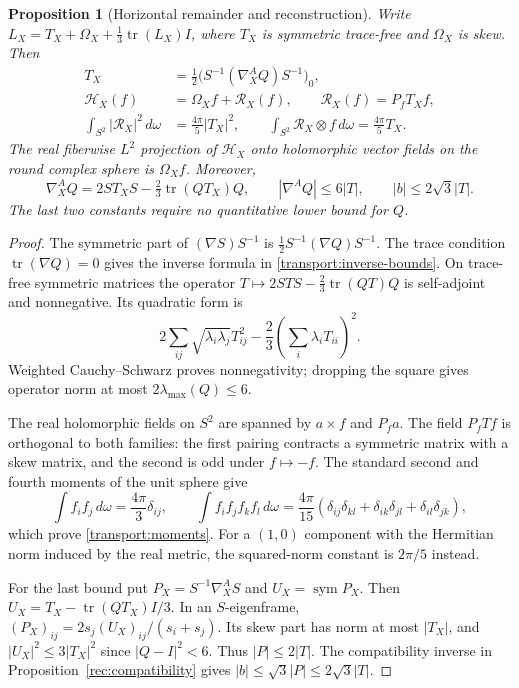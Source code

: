 \documentclass[11pt]{article}
\numberwithin{equation}{section}
\newtheorem{proposition}[theorem]{Proposition}
\theoremstyle{definition}
\theoremstyle{remark}
\DeclareMathOperator{\tr}{tr}
\begin{document}
\begin{proposition}[Horizontal remainder and reconstruction]
\label{prop:transport-remainder}
Write $L_X=T_X+\Omega_X+\tfrac13\tr(L_X)I$, where $T_X$ is symmetric
trace-free and $\Omega_X$ is skew. Then
\begin{align}
 T_X&=\tfrac12\bigl(S^{-1}(\nabla_X^A Q)S^{-1}\bigr)_0,
 \label{transport:strain}\\
 \mathcal H_X(f)&=\Omega_Xf+\mathcal R_X(f),\qquad
 \mathcal R_X(f)=P_fT_Xf,\nonumber\\
 \int_{S^2}|\mathcal R_X|^2\,d\omega&=\frac{4\pi}{5}|T_X|^2,\qquad
 \int_{S^2}\mathcal R_X\otimes f\,d\omega=\frac{4\pi}{5}T_X.
 \label{transport:moments}
\end{align}
The real fiberwise $L^2$ projection of $\mathcal H_X$ onto holomorphic
vector fields on the round complex sphere is $\Omega_Xf$. Moreover,
\begin{equation}\label{transport:inverse-bounds}
 \nabla_X^A Q=2ST_XS-\tfrac23\tr(QT_X)Q,\qquad
 |\nabla^A Q|\leq6|T|,\qquad |b|\leq2\sqrt3|T|.
\end{equation}
The last two constants require no quantitative lower bound for $Q$.
\end{proposition}
\begin{proof}
The symmetric part of $(\nabla S)S^{-1}$ is
$\tfrac12S^{-1}(\nabla Q)S^{-1}$. The trace condition
$\tr(\nabla Q)=0$ gives the inverse formula in
\eqref{transport:inverse-bounds}. On trace-free symmetric matrices the
operator $T\mapsto2STS-\tfrac23\tr(QT)Q$ is self-adjoint and nonnegative.
Its quadratic form is
\[
 2\sum_{ij}\sqrt{\lambda_i\lambda_j}T_{ij}^2
 -\frac23\left(\sum_i\lambda_iT_{ii}\right)^2.
\]
Weighted Cauchy--Schwarz proves nonnegativity; dropping the square gives
operator norm at most $2\lambda_{\max}(Q)\leq6$.

The real holomorphic fields on $S^2$ are spanned by $a\times f$ and
$P_fa$. The field $P_fTf$ is orthogonal to both families: the first
pairing contracts a symmetric matrix with a skew matrix, and the second
is odd under $f\mapsto-f$. The standard second and fourth moments of
the unit sphere give
\[
 \int f_if_j\,d\omega=\frac{4\pi}{3}\delta_{ij},\qquad
 \int f_if_jf_kf_l\,d\omega
 =\frac{4\pi}{15}(\delta_{ij}\delta_{kl}+\delta_{ik}\delta_{jl}
                      +\delta_{il}\delta_{jk}),
\]
which prove \eqref{transport:moments}. For a $(1,0)$ component with the
Hermitian norm induced by the real metric, the squared-norm constant is
$2\pi/5$ instead.

For the last bound put $P_X=S^{-1}\nabla_X^A S$ and $U_X=\operatorname{sym}P_X$.
Then $U_X=T_X-\tr(QT_X)I/3$. In an $S$-eigenframe,
$(P_X)_{ij}=2s_j(U_X)_{ij}/(s_i+s_j)$.
Its skew part has norm at most $|T_X|$, and
$|U_X|^2\leq3|T_X|^2$ since $|Q-I|^2<6$.
Thus $|P|\leq2|T|$. The compatibility inverse in
Proposition~\ref{rec:compatibility} gives
$|b|\leq\sqrt3|P|\leq2\sqrt3|T|$.
\end{proof}
\end{document}
